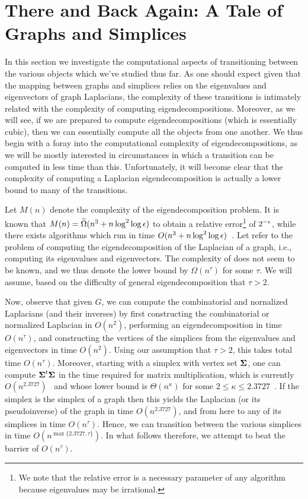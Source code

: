 \section{There and Back Again: A Tale of Graphs and Simplices}
In this section we investigate the computational aspects of transitioning between the various objects which we've studied thus far. As one should expect given that the mapping between graphs and simplices relies on the  eigenvalues and eigenvectors of graph  Laplacians, the complexity of these transitions is intimately related with the complexity of computing  eigendecompositions. 
Moreover, as we will see, if we are prepared to compute  eigendecompositions (which is essentially cubic), then we can essentially compute all the objects from one another. We thus begin  with a foray into the computational complexity of eigendecompositions, as we will be mostly  interested in circumstances in which a transition can be computed in less  time than this. Unfortunately, it will become clear that the complexity of  computing a Laplacian eigendecomposition is actually a lower bound to many of the transitions. 
 
Let $M(n)$ denote the complexity of the eigendecomposition problem. It is known that  $M(n)=\widetilde{\Omega}(n^3 + n\log^2 \log \epsilon)$ to obtain a relative error\footnote{We note that the relative error is a necessary parameter of any algorithm because eigenvalues may be irrational.} of $2^{-\epsilon}$, while there exists algorithms which run in time $O(n^3 + n\log^2 \log \epsilon)$~\cite{pan1999complexity}.  
Let \lapdecomp refer to the problem of computing the eigendecomposition of the Laplacian of a graph, i.e., computing its eigenvalues and eigenvectors. The complexity of \lapdecomp does not seem to be known, and we thus denote the lower bound by $\Omega(n^\tau)$ for some $\tau$. We will assume, based on the difficulty of general eigendecomposition that $\tau>2$. 


Now, observe that given $G$, we can compute the combinatorial and nornalized Laplacians (and their inverses) by first constructing the combinatorial or normalized Laplacian in $O(n^2)$, performing an eigendecomposition in time $O(n^\tau)$, and constructing the vertices of the simplices from the eigenvalues and eigenvectors in time $O(n^2)$. Using our  assumption that $\tau>2$, this takes total time $O(n^\tau)$.  Moreover, starting with a simplex with vertex set $\boldsymbol{\Sigma}$, one can compute $\boldsymbol{\Sigma}^t\boldsymbol{\Sigma}$ in the time required for matrix multiplication, which is currently $O(n^{2.3727})$~\cite{williams2012multiplying} and whose lower bound is $\Theta(n^\kappa)$ for some $2\leq \kappa\leq 2.3727$~\cite{stothers2010complexity}. If the simplex is the simplex of a graph then this yields the Laplacian (or its pseudoinverse) of the graph in time $O(n^{2.3727})$,  and from here to any of its simplices  in time $O(n^\tau)$. Hence, we can transition between the various simplices in time $O(n^{\max\{2.3727,\tau\}})$.  In what follows therefore, we attempt to beat the barrier of $O(n^\tau)$. 

